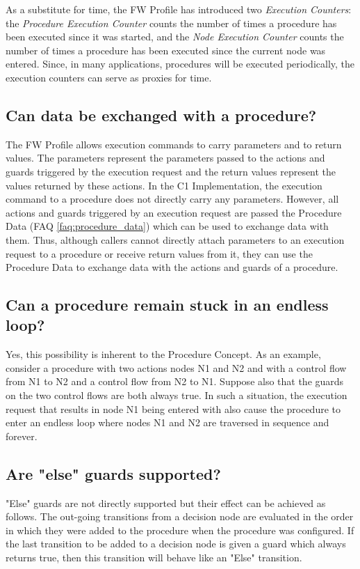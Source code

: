 \documentclass[faq]{../fwprofile}
\begin{document}
As a substitute for time, the FW Profile has introduced two \emph{Execution Counters}: the \emph{Procedure Execution Counter} counts the number of times 
a procedure has been executed since it was started, and the \emph{Node Execution Counter} counts the number of times a procedure has been executed since 
the current node was entered. Since, in many applications, procedures will be executed periodically, the execution counters can serve as proxies for time.  

\subsection{Can data be exchanged with a procedure?}
The FW Profile allows execution commands to carry parameters and to return values. The parameters represent the parameters passed to the actions and guards 
triggered by the execution request and the return values represent the values returned by these actions. In the C1 Implementation, the execution command 
to a procedure does not directly carry any parameters. However, all actions and guards triggered by an execution request are passed the Procedure Data 
(FAQ \ref{faq:procedure_data}) which can be used to exchange data with them. Thus, although callers cannot directly attach parameters 
to an execution request to a procedure or receive return values from it, they can use the Procedure Data to exchange data with the actions and guards of a procedure.

\subsection{Can a procedure remain stuck in an endless loop?}
Yes, this possibility is inherent to the Procedure Concept. As an example, consider a procedure with 
two actions nodes N1 and N2 and with a control flow from N1 to N2 and a control flow from N2 to N1. Suppose also that the guards on the two control flows 
are both always true. In such a situation, the execution request that results in node N1 being entered with also cause the procedure to enter an endless 
loop where nodes N1 and N2 are traversed in sequence and forever.

\subsection{Are "else" guards supported?}
"Else" guards are not directly supported but their effect can be achieved as follows. The out-going transitions from a decision node are evaluated 
in the order in which they were added to the procedure when the procedure was configured. If the last transition to be added to a decision node is 
given a guard which always returns true, then this transition will behave like an "Else" transition.
\end{document}
